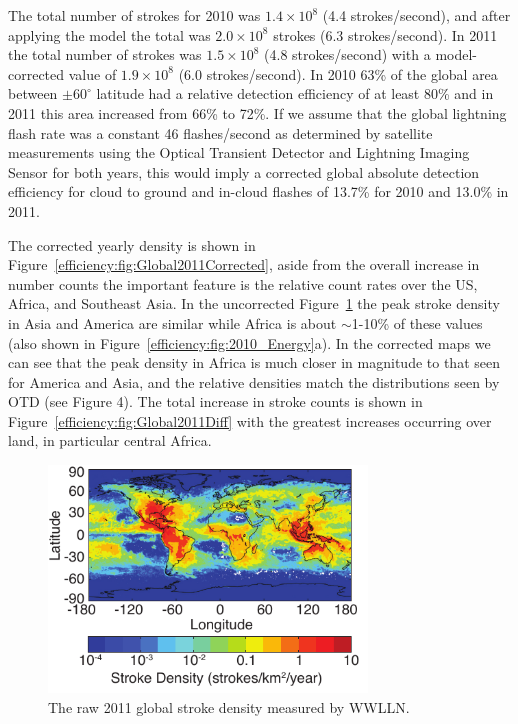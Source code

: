 The total number of strokes for 2010 was $1.4\times10^8$ (4.4 strokes/second), and after applying the model the total was $2.0\times10^8$ strokes (6.3 strokes/second).
In 2011 the total number of strokes was $1.5\times10^8$ (4.8 strokes/second) with a model-corrected value of $1.9\times10^8$ (6.0 strokes/second).
In 2010 63\% of the global area between $\pm60^\circ$ latitude had a relative detection efficiency of at least 80\% and in 2011 this area increased from 66\% to 72\%.
If we assume that the global lightning flash rate was a constant 46 flashes/second as determined by satellite measurements using the Optical Transient Detector and Lightning Imaging Sensor \citep{Cecil2011, Christian2003} for both years, this would imply a corrected global absolute detection efficiency for cloud to ground and in-cloud flashes of 13.7\% for 2010 and 13.0\% in 2011.

The corrected yearly density is shown in Figure~\ref{efficiency:fig:Global2011Corrected}, aside from the overall increase in number counts the important feature is the relative count rates over the US, Africa, and Southeast Asia.
In the uncorrected Figure~\ref{efficiency:fig:Global2011} the peak stroke density in Asia and America are similar while Africa is about $\sim$1-10\% of these values (also shown in Figure~\ref{efficiency:fig:2010_Energy}a).
In the corrected maps we can see that the peak density in Africa is much closer in magnitude to that seen for America and Asia, and the relative densities match the distributions seen by OTD (see \citet{Christian2003} Figure 4).
The total increase in stroke counts is shown in Figure~\ref{efficiency:fig:Global2011Diff} with the greatest increases occurring over land, in particular central Africa.

\begin{figure}[ht!]
   \centering
\noindent\includegraphics[width=20pc]{efficiency/Figures/2012RS005049-p14.pdf} 
   \caption{The raw 2011 global stroke density measured by WWLLN.}
   \label{efficiency:fig:Global2011}
\end{figure}

